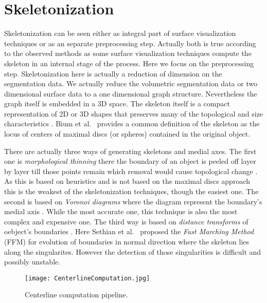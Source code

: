 \section{Skeletonization}

Skeletonization can be seen either as integral part of surface visualization techniques or as an separate preprocessing step. Actually both is true according to the observed methods as some surface visualization techniques compute the skeleton in an internal stage of the process. Here we focus on the preprocessing step.
Skeletonization here is actually a reduction of dimension on the segmentation data. We actually reduce the volumetric segmentation data or two dimensional surface data to a one dimensional graph structure. Nevertheless the graph itself is embedded in a 3D space.
The skeleton itself is a compact representation of 2D or 3D shapes that preserves many of the topological and size characteristics \cite{alexandru2002augmented}. Bium et al.~\cite{bium1964transformation} provides a common definition of the skeleton as the locus of centers of maximal discs (or spheres) contained in the original object.

There are actually three ways of generating skeletons and medial axes. The first one is \emph{morphological thinning} there the boundary of an object is peeled off layer by layer till those points remain which removal would cause topological change \cite{alexandru2002augmented}. As this is based on heuristics and is not based on the maximal discs approach this is the weakest of the skeletonization techniques, though the easiest one. The second is based on \emph{Voronoi diagrams} where the diagram represent the boundary's medial axis \cite{alexandru2002augmented}. While the most accurate one, this technique is also the most complex and expensive one. The third way is based on \emph{distance transforms} of oebject's boundaries \cite{alexandru2002augmented}. Here Sethian et al.~\cite{sethian1996fast} proposed the \emph{Fast Marching Method} (FFM) for evolution of boundaries in normal direction where the skeleton lies along the singularites. However the detection of those singularities is difficult and possibly unstable.

\begin{figure}[h]
	\centering
	\texttt{[image: CenterlineComputation.jpg]} \\
	\caption{Centerline computation pipeline.}
	\cite{alexandru2002augmented}
	\label{fig:CenterlineComputation}
\end{figure} 

